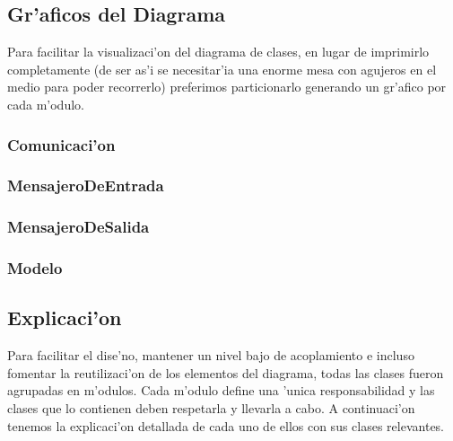 \subsection{Gr'aficos del Diagrama}
Para facilitar la visualizaci'on del diagrama de clases, en lugar de imprimirlo completamente (de ser as'i se necesitar'ia una enorme mesa con agujeros en el medio para poder recorrerlo) preferimos particionarlo generando un gr'afico por cada m'odulo.

\subsubsection{Comunicaci'on}
\clearpage

\subsubsection{MensajeroDeEntrada}
\clearpage

\subsubsection{MensajeroDeSalida}
\clearpage

\subsubsection{Modelo}
\clearpage



\clearpage



\subsection{Explicaci'on}
Para facilitar el dise'no, mantener un nivel bajo de acoplamiento e incluso fomentar la reutilizaci'on de los elementos del diagrama, todas las clases fueron agrupadas en m'odulos. Cada m'odulo define una 'unica responsabilidad y las clases que lo contienen deben respetarla y llevarla a cabo. A continuaci'on tenemos la explicaci'on detallada de cada uno de ellos con sus clases relevantes.


